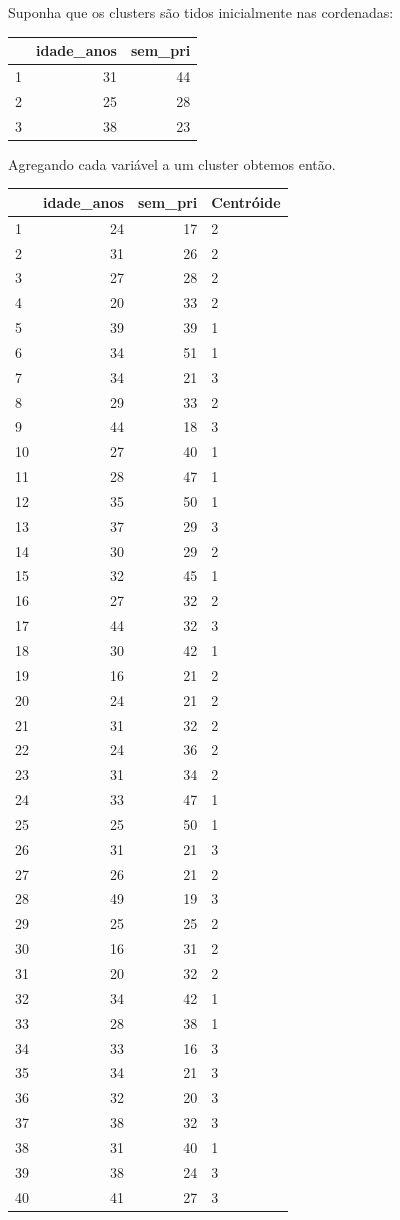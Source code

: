 \documentclass[
  letterpaper,
  DIV=11,
  numbers=noendperiod]{scrreprt}
\begin{document}
Suponha que os clusters são tidos inicialmente nas cordenadas:

\begin{longtable}[]{@{}lrr@{}}
\toprule()
& idade\_anos & sem\_pri \\
\midrule()
\endhead
1 & 31 & 44 \\
2 & 25 & 28 \\
3 & 38 & 23 \\
\bottomrule()
\end{longtable}

Agregando cada variável a um cluster obtemos então.

\begin{longtable}[]{@{}lrrl@{}}
\toprule()
& idade\_anos & sem\_pri & Centróide \\
\midrule()
\endhead
1 & 24 & 17 & 2 \\
2 & 31 & 26 & 2 \\
3 & 27 & 28 & 2 \\
4 & 20 & 33 & 2 \\
5 & 39 & 39 & 1 \\
6 & 34 & 51 & 1 \\
7 & 34 & 21 & 3 \\
8 & 29 & 33 & 2 \\
9 & 44 & 18 & 3 \\
10 & 27 & 40 & 1 \\
11 & 28 & 47 & 1 \\
12 & 35 & 50 & 1 \\
13 & 37 & 29 & 3 \\
14 & 30 & 29 & 2 \\
15 & 32 & 45 & 1 \\
16 & 27 & 32 & 2 \\
17 & 44 & 32 & 3 \\
18 & 30 & 42 & 1 \\
19 & 16 & 21 & 2 \\
20 & 24 & 21 & 2 \\
21 & 31 & 32 & 2 \\
22 & 24 & 36 & 2 \\
23 & 31 & 34 & 2 \\
24 & 33 & 47 & 1 \\
25 & 25 & 50 & 1 \\
26 & 31 & 21 & 3 \\
27 & 26 & 21 & 2 \\
28 & 49 & 19 & 3 \\
29 & 25 & 25 & 2 \\
30 & 16 & 31 & 2 \\
31 & 20 & 32 & 2 \\
32 & 34 & 42 & 1 \\
33 & 28 & 38 & 1 \\
34 & 33 & 16 & 3 \\
35 & 34 & 21 & 3 \\
36 & 32 & 20 & 3 \\
37 & 38 & 32 & 3 \\
38 & 31 & 40 & 1 \\
39 & 38 & 24 & 3 \\
40 & 41 & 27 & 3 \\
\bottomrule()
\end{longtable}
\end{document}
